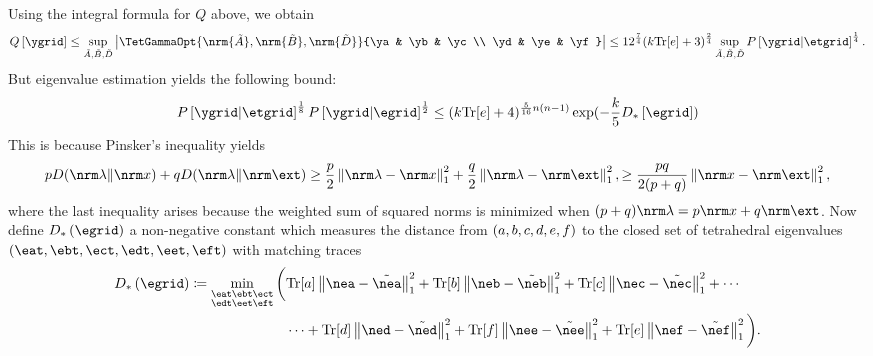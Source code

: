 \documentclass[notitlepage, 10pt]{article}
\begin{document}
{\begin{equation}
    \end{equation}
    Using the integral formula for $Q$ above, we obtain
    \begin{equation}
        Q\left[\ygrid\right] \leq \sup_{\tilde A,\tilde B,\tilde D} \abs{\TetGammaOpt{\nrm{\tilde A},\nrm{\tilde B},\nrm{\tilde D}}{\ya & \yb & \yc \\ \yd & \ye & \yf}} \leq 12^\frac{7}{4}(k {\tee}+3)^{\frac{2}{4}} \sup_{\tilde A,\tilde B,\tilde D}P\left[\ygrid\middle|\etgrid \right]^{\frac{1}{4}}.
    \end{equation}
    But eigenvalue estimation yields the following bound:
    \begin{equation}
        P\left[\ygrid\middle|\etgrid \right]^{\frac{1}{8}} P\left[\ygrid\middle|\egrid \right]^{\frac{1}{2}} \leq (k{\tee}+4)^{\frac{5}{16}n(n-1)}\exp(-\frac{k}{5} D_{*}\left[\egrid \right] )
    \end{equation}
    This is because Pinsker's inequality yields
    \begin{align}
        p\kl{\nrm \yx}{\nrm \ex} + q\kl{\nrm \yx}{\nrm \ext}
        \geq \frac{p}{2} \norm{\nrm \yx - \nrm \ex}_1^{2} + \frac{q}{2}\norm{\nrm \yx - \nrm \ext}_1^{2},
        \geq \frac{pq}{2(p+q)} \norm{\nrm \ex - \nrm \ext}_1^{2},
    \end{align}
    where the last inequality arises because the weighted sum of squared norms is minimized when $(p+q)\nrm \yx = p \nrm \ex + q \nrm \ext$.
    Now define $D_{*}\left(\egrid \right)$ a non-negative constant which measures the distance from $(a, b, c, d, e, f)$ to the closed set of tetrahedral eigenvalues $(\eat, \ebt, \ect, \edt, \eet, \eft)$ with matching traces
    \begin{align}
        \begin{split}
            D_{*}\left(\egrid \right) \coloneqq
            \min_{\substack{\eat \ebt \ect \\ \edt \eet \eft}}
            \bigg(
                &{\tea}\norm{\nea - \tilde{\nea}}_{1}^{2}
                + {\teb}\norm{\neb - \tilde{\neb}}_{1}^{2}
                + {\tec}\norm{\nec - \tilde{\nec}}_{1}^{2} + \cdots \\
                &\cdots + {\ted}\norm{\ned - \tilde{\ned}}_{1}^{2}
                + {\tef}\norm{\nee - \tilde{\nee}}_{1}^{2}
                + {\tee}\norm{\nef - \tilde{\nef}}_{1}^{2}
            \bigg).
        \end{split}
    \end{align}
}
\end{document}
